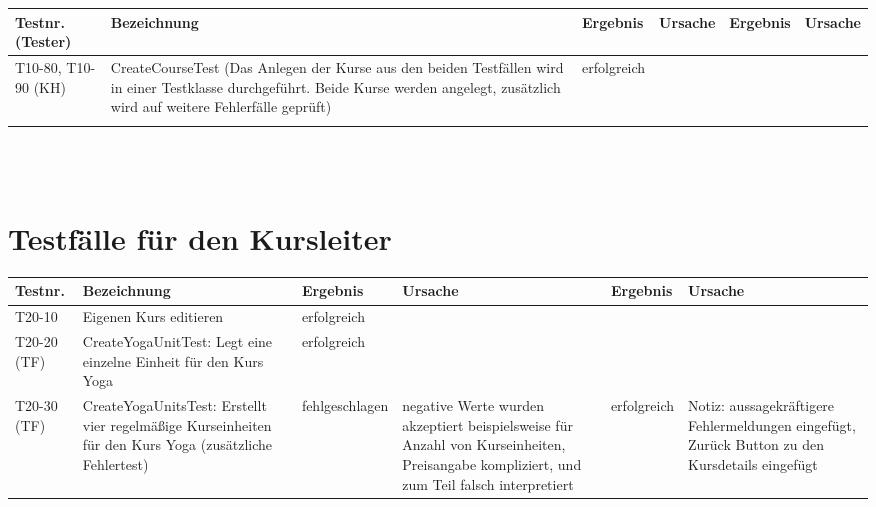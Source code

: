 \begin{landscape}
\begin{tabular}{|p{2.0cm} |p{5.0cm}|p{3.0cm}|p{5.0cm}|p{4.0cm}|p{4.0cm}|}
			
			
			\hline 
		\end{tabular} \ \\
		\ \\			
			
			\begin{tabular}{|p{2.0cm} |p{5.0cm}|p{3.0cm}|p{5.0cm}|p{4.0cm}|p{4.0cm}|}
			\hline \textbf{Testnr. (Tester)} & \textbf{Bezeichnung} & \textbf{Ergebnis} & \textbf{Ursache} & \textbf{Ergebnis} & \textbf{Ursache} \\ 			
						
			
			
			
			\hline T10-80, T10-90 (KH)   &      CreateCourseTest  (Das Anlegen der Kurse aus den beiden Testfällen wird in einer Testklasse durchgeführt. Beide Kurse werden angelegt, zusätzlich wird auf weitere Fehlerfälle geprüft)              &      erfolgreich             &                  &                   &                  \\ 
			\hline       &          &          &        &         &       \\
			\hline 
		\end{tabular} \ \\
		\ \\
	\section{Testfälle für den Kursleiter}
		\begin{tabular}{|p{2.0cm} |p{5.0cm}|p{3.0cm}|p{5.0cm}|p{4.0cm}|p{4.0cm}|}
			\hline \textbf{Testnr.} & \textbf{Bezeichnung} & \textbf{Ergebnis} & \textbf{Ursache} & \textbf{Ergebnis} & \textbf{Ursache} \\
			\hline T20-10 & Eigenen Kurs editieren & erfolgreich &  &         &       \\
			\hline  T20-20 (TF)     & CreateYogaUnitTest: Legt eine einzelne Einheit für den Kurs Yoga  &  erfolgreich      	& 	&  &       \\
			
			\hline  T20-30 (TF)     & CreateYogaUnitsTest: Erstellt vier regelmäßige Kurseinheiten für den Kurs Yoga (zusätzliche Fehlertest)  &   fehlgeschlagen      
			& negative Werte wurden akzeptiert beispielsweise für Anzahl von Kurseinheiten, Preisangabe kompliziert, und zum Teil falsch interpretiert
			&  erfolgreich       &  Notiz: aussagekräftigere Fehlermeldungen eingefügt, Zurück Button zu den Kursdetails eingefügt      \\
						

\end{tabular}
\end{landscape}
